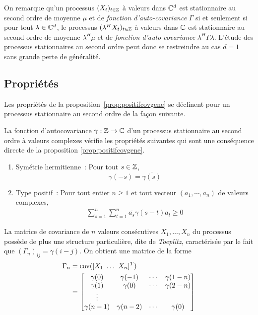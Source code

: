On remarque qu'un processus $(X_{t})_{t \in \mathbb{Z}}$ \`a valeurs dans $\mathbb{C}^d$
est stationnaire au second ordre de moyenne $\mu$ et de \emph{fonction
  d'auto-covariance} $\Gamma$ si et seulement si pour tout $\lambda\in\mathbb{C}^d$,
le processus $(\lambda^HX_{t})_{t \in \mathbb{Z}}$ \`a valeurs dans $\mathbb{C}$ est
stationnaire au second ordre de moyenne $\lambda^H\mu$ et de \emph{fonction
  d'auto-covariance} $\lambda^H\Gamma\lambda$.  L'\'etude des processus
stationnaires au second ordre peut donc se restreindre au cas $d=1$ sans grande
perte de g\'en\'eralit\'e.





\subsection{Propri\'et\'es}
Les propri\'et\'es de la proposition~\ref{prop:positifcovgene} se d\'eclinent pour un
processus stationnaire au second ordre de la fa\c{c}on suivante.
\begin{proposition}
 \label{prop:stat2}
 La fonction d'autocovariance $\gamma: \mathbb{Z} \rightarrow \mathbb{C}$ d'un processus
 stationnaire au second ordre \`a valeurs complexes v\'erifie les propri\'et\'es
 suivantes qui sont une cons\'equence directe de la proposition
 \ref{prop:positifcovgene}.
\begin{enumerate}
\item Sym\'etrie hermitienne~:  Pour tout $s\in\mathbb{Z}$,
\[
\gamma(-s)= \overline{\gamma(s)}
\]
\item\label{item:type_positif} Type positif~:  Pour tout entier $n\geq1$ et tout
  vecteur $(a_1, \cdots, a_n)$ de valeurs complexes,
\begin{eqnarray*}
   \sum_{s=1}^{n}\sum_{t=1}^{n}
\overline{a_s} \gamma(s-t) a_t \geq 0
\end{eqnarray*}
\end{enumerate}
\end{proposition}
La matrice de covariance de $n$ valeurs cons\'ecutives $X_1,\dots,X_n$ du
processus poss\`ede de plus une structure particuli\`ere, dite de \emph{Toeplitz},
caract\'eris\'ee par le fait que $(\Gamma_n)_{ij} = \gamma(i-j)$.  On obtient une
matrice de la forme
 \begin{align}
 \Gamma_n \nonumber
      &=\mathrm{cov}([X_1\,\,\dots\,\, X_n]^T) \\
      &=
     \left [
     \begin{matrix}
      \gamma(0)&\gamma(-1)&\cdots&\gamma(1-n)\\
      \gamma(1)&\gamma(0)&\cdots&\gamma(2-n)\\
        \vdots\\
      \gamma(n-1)&\gamma(n-2)&\cdots&\gamma(0)
     \end{matrix}
     \right ]
 \label{eq:matcov}
\end{align}
